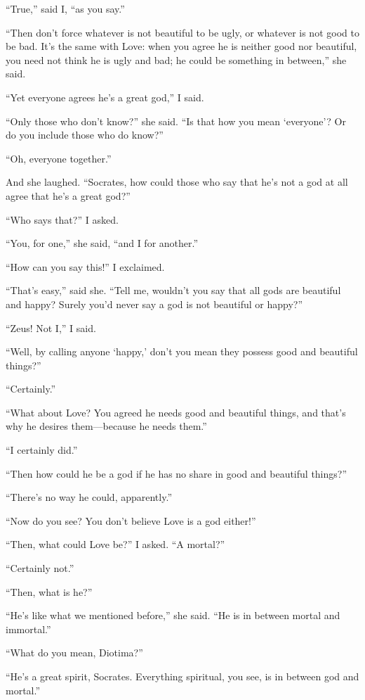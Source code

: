 “True,” said I, “as you say.” 

“Then don’t force whatever is not beautiful to be ugly, or whatever is
not good to be bad. It’s the same with Love: when you agree he is
neither good nor beautiful, you need not think he is ugly and bad; he
could be something in between,” she said.

“Yet everyone agrees he’s a great god,” I said.

“Only those who don’t know?” she said. “Is that how you mean ‘everyone’?
Or do you include those who do know?”

“Oh, everyone together.”

And she laughed. “Socrates, how could those who say that he’s not a
 god at all agree that he’s a great god?”

“Who says that?” I asked.

“You, for one,” she said, “and I for another.”

“How can you say this!” I exclaimed.

“That’s easy,” said she. “Tell me, wouldn’t you say that all gods are
beautiful and happy? Surely you’d never say a god is not beautiful or
happy?”

“Zeus! Not I,” I said.

“Well, by calling anyone ‘happy,’ don’t you mean they possess good and
beautiful things?”

“Certainly.” 

“What about Love? You agreed he needs good and beautiful things, and
that’s why he desires them---because he needs them.”

“I certainly did.”

“Then how could he be a god if he has no share in good and beautiful
things?”

“There’s no way he could, apparently.”

“Now do you see? You don’t believe Love is a god either!”

“Then, what could Love be?” I asked. “A mortal?”

“Certainly not.”

“Then, what is he?”

“He’s like what we mentioned before,” she said. “He is in between mortal
and immortal.”

“What do you mean, Diotima?”

“He’s a great spirit, Socrates. Everything spiritual, you see, is in
between  god and mortal.”

